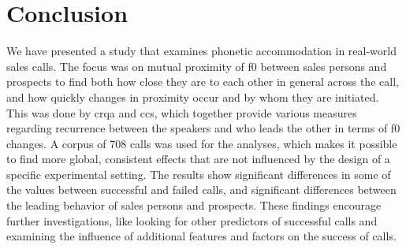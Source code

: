 \section{Conclusion}
\label{sec:conclusion}

We have presented a study that examines phonetic accommodation in real-world sales calls.
The focus was on mutual proximity of \acl{f0} between sales persons and prospects to find both how close they are to each other in general across the call, and how quickly changes in proximity occur and by whom they are initiated.
This was done by \acf{crqa} and \aclp{cc}, which together provide various measures regarding recurrence between the speakers and who leads the other in terms of \acl{f0} changes.
A corpus of 708 calls was used for the analyses, which makes it possible to find more global, consistent effects that are not influenced by the design of a specific experimental setting.
The results show significant differences in some of the values between successful and failed calls, and significant differences between the leading behavior of sales persons and prospects.
These findings encourage further investigations, like looking for other predictors of successful calls and examining the influence of additional features and factors on the success of calls.


